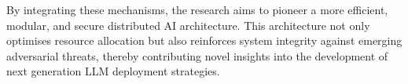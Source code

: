 \noindent By integrating these mechanisms, the research aims to pioneer a more efficient, modular, and secure distributed AI architecture. This architecture not only optimises resource allocation but also reinforces system integrity against emerging adversarial threats, thereby contributing novel insights into the development of next generation LLM deployment strategies.